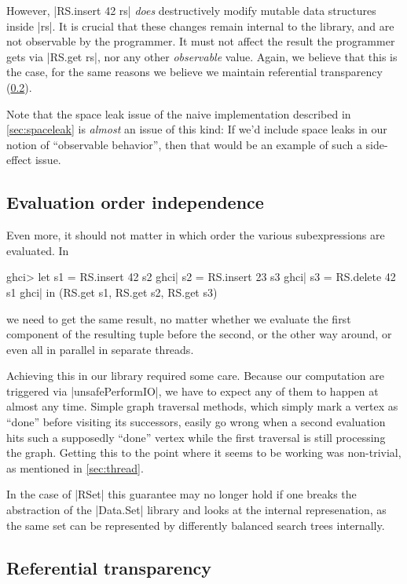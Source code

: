 \documentclass[manuscript,review,screen,acmsmall]{acmart}
\begin{document}
However, |RS.insert 42 rs| \emph{does} destructively modify mutable data structures inside |rs|. It is crucial that these changes remain internal to the library, and are not observable by the programmer. It must not affect the result the programmer gets via |RS.get rs|, nor any other \emph{observable} value. Again, we believe that this is the case, for the same reasons we believe we maintain referential transparency (\cref{sec:reftrans}).

Note that the space leak issue of the naive implementation described in \cref{sec:spaceleak} is \emph{almost} an issue of this kind: If we’d include space leaks in our notion of “observable behavior”, then that would be an example of such a side-effect issue.

\subsection{Evaluation order independence}

Even more, it should not matter in which order the various subexpressions are evaluated. In
\begin{code}
ghci> let  s1 = RS.insert 42 s2
ghci|      s2 = RS.insert 23 s3
ghci|      s3 = RS.delete 42 s1
ghci| in (RS.get s1, RS.get s2, RS.get s3)
\end{code}
we need to get the same result, no matter whether we evaluate the first component of the resulting tuple before the second, or the other way around, or even all in parallel in separate threads.

Achieving this in our library required some care. Because our computation are triggered via |unsafePerformIO|, we have to expect any of them to happen at almost any time. Simple graph traversal methods, which simply mark a vertex as “done” before visiting its successors, easily go wrong when a second evaluation hits such a supposedly “done” vertex while the first traversal is still processing the graph. Getting this to the point where it seems to be working was non-trivial, as mentioned in \cref{sec:thread}.

In the case of |RSet| this guarantee may no longer hold if one breaks the abstraction of the |Data.Set| library and looks at the internal represenation, as the same set can be represented by differently balanced search trees internally.

\subsection{Referential transparency}\label{sec:reftrans}
\end{document}
